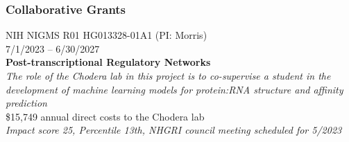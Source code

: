 \documentclass[10pt]{article}
\begin{document}

% 






\subsubsection*{Collaborative Grants}

NIH NIGMS R01 HG013328-01A1 (PI: Morris)\\
7/1/2023 -- 6/30/2027\\
{\bf Post-transcriptional Regulatory Networks}\\
\emph{The role of the Chodera lab in this project is to co-supervise a student in the development of machine learning models for protein:RNA structure and affinity prediction}\\
\$15,749 annual direct costs to the Chodera lab\\
\emph{Impact score 25, Percentile 13th, NHGRI council meeting scheduled for 5/2023}
\end{document}
